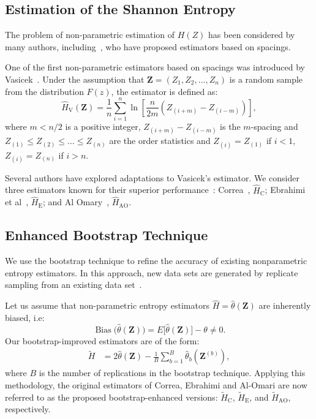 \documentclass[remotesensing,article,submit,moreauthors,pdftex]{Definitions/mdpi}
\begin{document}
\hypertarget{estimation-of-the-shannon-entropy}{%
\subsection{Estimation of the Shannon
Entropy}\label{estimation-of-the-shannon-entropy}}

The problem of non-parametric estimation of \(H(Z)\) has been considered by many authors, including~\cite{vasicek1976test, Wieczorkowski1999,correa1995new,AlOmari2019},
who have proposed estimators based on spacings.

One of the first non-parametric estimators based on spacings was introduced by Vasicek~\cite{vasicek1976test}. Under the assumption that
\(\bm{Z}=(Z_1, Z_2,\ldots,Z_n)\) is a random sample from the distribution \(F(z)\), the estimator is defined as:
\begin{equation*}
\label{E:Vas}
    \widehat{H}_{\text{V}}(\bm{Z})=\frac{1}{n}\sum_{i=1}^{n}\ln\left[\frac{n}{2m}\left(Z_{(i+m)}-Z_{(i-m)}\right)\right],
    \end{equation*} where \(m<n/2\) is a positive integer,
\(Z_{(i+m)}-Z_{(i-m)}\) is the \(m\)-spacing and
\(Z_{(1)}\leq Z_{(2)}\leq\ldots\leq Z_{(n)}\) are the order statistics
and \(Z_{(i)}= Z_{(1)}\) if \(i<1\), \(Z_{(i)}= Z_{(n)}\) if \(i>n\).

Several authors have explored adaptations to Vasicek's estimator. 
We consider three estimators known for their superior performance~\cite{Cassetti2022}:
Correa~\cite{correa1995new}, \(\widehat{H}_{\text{C}}\);
Ebrahimi et al~\cite{Ebrahimi1994}, \(\widehat{H}_{\mathrm{E}}\);
and Al Omary~\cite{IbrahimAlOmari2014}, \(\widehat{H}_{\mathrm{AO}}\).

\hypertarget{enhanced-bootstrap-technique}{%
\subsection{Enhanced Bootstrap
Technique}\label{enhanced-bootstrap-technique}}

We use the bootstrap technique to refine the accuracy of existing nonparametric entropy estimators. In this approach, new data sets are generated by replicate sampling from an existing data set~\cite{Michelucci2021}.

Let us assume that non-parametric entropy estimators
\(\widehat{H}=\widehat{\theta}(\bm{Z})\) are inherently biased, i.e:\begin{equation}
\label{Eq:bias1}
\operatorname{Bias}\big(\widehat{\theta}(\bm{Z})\big) = E\big[\widehat{\theta}(\bm{Z})\big] - \theta \neq 0.
\end{equation} Our bootstrap-improved estimators are of the form:
\begin{align*}
\widetilde{H} &= 2\widehat{\theta}(\bm{Z}) - \frac{1}{B}\sum_{b=1}^B \widehat{\theta}_b(\bm{Z}^{(b)}),
\end{align*} 
where \(B\) is the number of replications in the bootstrap
technique. 
Applying this methodology, the original estimators of Correa,
Ebrahimi and Al-Omari are now referred to as the proposed bootstrap-enhanced versions:
\(\widetilde{H}_{\text{C}}\),
\(\widetilde{H}_{\text{E}}\), and \(\widetilde{H}_{\text{AO}}\),
respectively.
\end{document}
